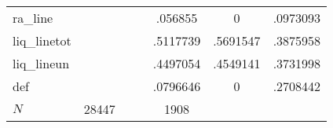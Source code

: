 \begin{table}[htbp]
\begin{tabular}{l*{2}{ccc}}
ra\_line     &            &            &            &     .056855&           0&    .0973093\\
liq\_linetot &            &            &            &    .5117739&    .5691547&    .3875958\\
liq\_lineun  &            &            &            &    .4497054&    .4549141&    .3731998\\
def         &            &            &            &    .0796646&           0&    .2708442\\
\hline
\(N\)       &       28447&            &            &        1908&            &            \\
\hline\hline
\end{tabular}
\end{table}
